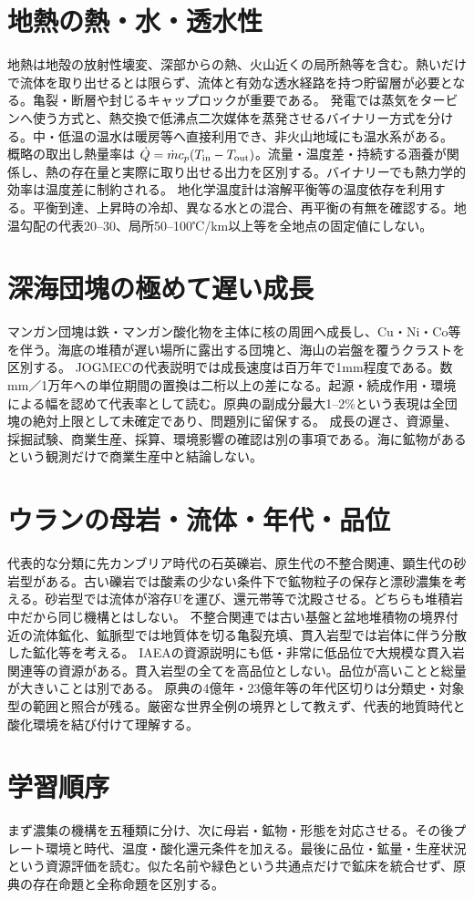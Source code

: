\section{地熱の熱・水・透水性}\label{theory:ore:geothermal}
地熱は地殻の放射性壊変、深部からの熱、火山近くの局所熱等を含む。熱いだけで流体を取り出せるとは限らず、流体と有効な透水経路を持つ貯留層が必要となる。亀裂・断層や封じるキャップロックが重要である\cite{ore50_reservoir_ref}。
発電では蒸気をタービンへ使う方式と、熱交換で低沸点二次媒体を蒸発させるバイナリー方式を分ける。中・低温の温水は暖房等へ直接利用でき、非火山地域にも温水系がある\cite{ore50_geothermal_ref}。
概略の取出し熱量率は \(\dot Q=\dot m c_p(T_{\rm in}-T_{\rm out})\)。流量・温度差・持続する涵養が関係し、熱の存在量と実際に取り出せる出力を区別する。バイナリーでも熱力学的効率は温度差に制約される。
地化学温度計は溶解平衡等の温度依存を利用する。平衡到達、上昇時の冷却、異なる水との混合、再平衡の有無を確認する。地温勾配の代表20--30、局所50--100℃/km以上等を全地点の固定値にしない。

\section{深海団塊の極めて遅い成長}\label{theory:ore:marine}
マンガン団塊は鉄・マンガン酸化物を主体に核の周囲へ成長し、Cu・Ni・Co等を伴う。海底の堆積が遅い場所に露出する団塊と、海山の岩盤を覆うクラストを区別する。
JOGMECの代表説明では成長速度は百万年で1mm程度である\cite{ore50_nodule_ref}。数mm／1万年への単位期間の置換は二桁以上の差になる。起源・続成作用・環境による幅を認めて代表率として読む。原典の副成分最大1--2\%という表現は全団塊の絶対上限として未確定であり、問題別に留保する。
成長の遅さ、資源量、採掘試験、商業生産、採算、環境影響の確認は別の事項である。海に鉱物があるという観測だけで商業生産中と結論しない。

\section{ウランの母岩・流体・年代・品位}\label{theory:ore:uranium}
代表的な分類に先カンブリア時代の石英礫岩、原生代の不整合関連、顕生代の砂岩型がある\cite{ore50_uranium_ref}。古い礫岩では酸素の少ない条件下で鉱物粒子の保存と漂砂濃集を考える。砂岩型では流体が溶存Uを運び、還元帯等で沈殿させる。どちらも堆積岩中だから同じ機構とはしない。
不整合関連では古い基盤と盆地堆積物の境界付近の流体鉱化、鉱脈型では地質体を切る亀裂充填、貫入岩型では岩体に伴う分散した鉱化等を考える。
IAEAの資源説明にも低・非常に低品位で大規模な貫入岩関連等の資源がある\cite{ore50_intrusive_ref}。貫入岩型の全てを高品位としない。品位が高いことと総量が大きいことは別である。
原典の4億年・23億年等の年代区切りは分類史・対象型の範囲と照合が残る。厳密な世界全例の境界として教えず、代表的地質時代と酸化環境を結び付けて理解する。

\section{学習順序}
まず濃集の機構を五種類に分け、次に母岩・鉱物・形態を対応させる。その後プレート環境と時代、温度・酸化還元条件を加える。最後に品位・鉱量・生産状況という資源評価を読む。似た名前や緑色という共通点だけで鉱床を統合せず、原典の存在命題と全称命題を区別する。
